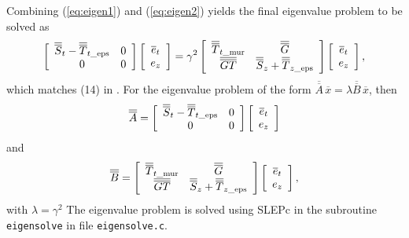 \documentclass[titlepage]{article}
\renewcommand\_{\textunderscore\linebreak[1]}
\begin{document}
Combining (\ref{eq:eigen1}) and (\ref{eq:eigen2}) yields the final eigenvalue problem to be solved as
\begin{equation}
\label{eq:eigen}
\left[ \begin{array}{cc}
  \overline{\overline{S}}_t - \overline{\overline{T}}_{t\textnormal{\_eps}} & 0 \\
  0 & 0 \\
\end{array} \right]
\left[ \begin{array}{c}
  \overline{e}_t \\
  e_z \\
\end{array} \right] = \gamma^2
\left[ \begin{array}{cc}
  \overline{\overline{T}}_{t\textnormal{\_mur}} & \overline{\overline{G}} \\
  \overline{\overline{GT}} & \overline{\overline{S}}_z + \overline{\overline{T}}_{z\textnormal{\_eps}} \\
\end{array} \right]
\left[ \begin{array}{c}
  \overline{e}_t \\
  e_z \\
\end{array} \right],
\end{equation}
which matches (14) in \cite{Lee}. For the eigenvalue problem of the form $\overline{\overline{A}}\,\overline{x}=\lambda\overline{\overline{B}}\,\overline{x}$, then
\begin{equation}
\overline{\overline{A}}=\left[ \begin{array}{cc}
  \overline{\overline{S}}_t - \overline{\overline{T}}_{t\textnormal{\_eps}} & 0 \\
  0 & 0 \\
\end{array} \right]
\left[ \begin{array}{c}
  \overline{e}_t \\
  e_z \\
\end{array} \right]
\end{equation}
and
\begin{equation}
\overline{\overline{B}}=
\left[ \begin{array}{cc}
  \overline{\overline{T}}_{t\textnormal{\_mur}} & \overline{\overline{G}} \\
  \overline{\overline{GT}} & \overline{\overline{S}}_z + \overline{\overline{T}}_{z\textnormal{\_eps}} \\
\end{array} \right]
\left[ \begin{array}{c}
  \overline{e}_t \\
  e_z \\
\end{array} \right],
\end{equation}
with $\lambda=\gamma^2$
The eigenvalue problem is solved using SLEPc \cite{SLEPc} in the subroutine \texttt{eigensolve} in file \texttt{eigensolve.c}.
\end{document}
